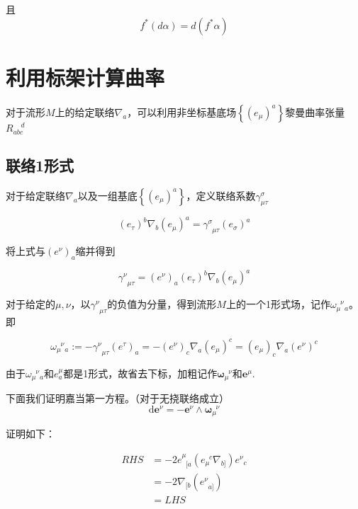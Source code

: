 \documentclass{ctexbook}
\begin{document}
\begin{e   quation}
且
\begin{equation}
    f^{*}(d\alpha)=d(f^{*}\alpha)
\end{equation}

\chapter{利用标架计算曲率}
对于流形$M$上的给定联络$\nabla_a$，可以利用非坐标基底场$\left\{\left(e_\mu\right)^{a}\right\}$黎曼曲率张量$R_{abc}^{\;\;\;\;d}$


\section{联络1形式}

对于给定联络$\nabla_a$以及一组基底$\left\{\left(e_\mu\right)^{a}\right\}$，定义联络系数$\gamma^{\sigma}_{\mu\tau}$

\begin{equation}
    \left(e_\tau\right)^{b}\nabla_b\left(e_\mu\right)^{a}=\gamma^{\sigma}_{\;\;\mu\tau}\left(e_\sigma\right)^{a}
\end{equation}

将上式与$\left(e^{\nu}\right)_{a}$缩并得到

\begin{equation}
    \gamma^{\nu}_{\;\;\mu\tau}=\left(e^{\nu}\right)_a\left(e_\tau\right)^{b}\nabla_b\left(e_\mu\right)^{a}
\end{equation}

对于给定的$\mu,\nu$，以$\gamma^{\nu}_{\;\;\mu\tau}$的负值为分量，得到流形$M$上的一个1形式场，记作$\omega^{\;\;\nu}_{\mu\;\;a}$。即

\begin{equation}
    \omega^{\;\;\nu}_{\mu\;\;a}:=-\gamma^{\nu}_{\;\;\mu\tau}\left(e^{\tau}\right)_{a}=-(e^{\nu})_c\nabla_a(e_\mu)^c=(e_{\mu})_c\nabla_a(e^\nu)^c
\end{equation}

由于$\omega^{\;\;\nu}_{\mu\;\;a}$和$e^{\mu}_a$都是1形式，故省去下标，加粗记作$\bm{\omega}_{\mu}^{\;\;\nu}$和$\bm{e}^\mu$.

下面我们证明嘉当第一方程。（对于无挠联络成立）
\begin{equation}
    \mathrm{d}\bm{e}^{\nu}=-\bm{e}^{\nu}\wedge\bm{\omega}_{\mu}^{\;\;\nu}
\end{equation}

证明如下：

\begin{equation}
    \begin{split}
        RHS
        &=-2e^{\mu}_{\;\;[a}(e_{\mu}^{\;\;c}\nabla_{b]})e^{\nu}_{\;\;c}\\
        &=-2\nabla_{[b}(e^{\nu}_{\;\;a]})\\
        &=LHS\\
    \end{split}
\end{equation}



\end{e   quation}
\end{document}
